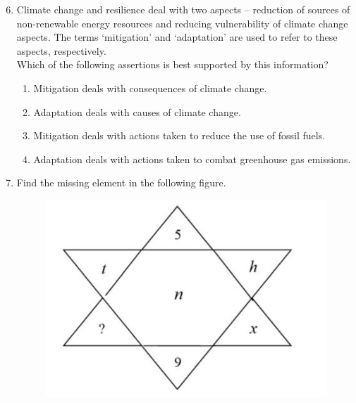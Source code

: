 \documentclass[12pt,onecolumn]{article}
\begin{document}
\begin{enumerate}
    \setcounter{enumi}{5}
    \item Climate change and resilience deal with two aspects – reduction of sources of non-renewable energy resources and reducing vulnerability of climate change aspects. The terms `mitigation' and `adaptation' are used to refer to these aspects, respectively.\\Which of the following assertions is best supported by this information?
          \begin{enumerate}
              \item Mitigation deals with consequences of climate change.
              \item Adaptation deals with causes of climate change.
              \item Mitigation deals with actions taken to reduce the use of fossil fuels.
              \item Adaptation deals with actions taken to combat greenhouse gas emissions.
          \end{enumerate}

    \item Find the missing element in the following figure.
          \begin{figure}[H]
              \centering
              \includegraphics[scale=0.4]{q7s2}
              \label{fig:q7s2}
          \end{figure}
          \begin{enumerate}
          \end{enumerate}


\end{enumerate}
\end{document}
